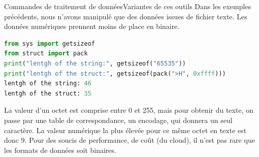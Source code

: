 \documentclass{beamer}
\begin{document}
    \begin{frame}[fragile]{Commandes de traitement de données}{Variantes de ces outils}
        Dans les exemples précédents, nous n'avons manipulé que des données issues de fichier texte.
        Les données numériques prennent moins de place en binaire.
        \begin{lstlisting}[language=python]
from sys import getsizeof
from struct import pack
print("lentgh of the string:", getsizeof("65535"))
print("lentgh of the struct:", getsizeof(pack(">H", 0xffff)))
lentgh of the string: 46
lentgh of the struct: 35
        \end{lstlisting}
        La valeur d'un octet est comprise entre 0 et 255, mais pour obtenir du texte, on passe par une table de correspondance, un encodage, qui donnera un seul caractère.
        La valeur numérique la plus élevée pour ce même octet en texte est donc 9.
        \bigbreak
        Pour des soucis de performance, de coût (du cloud), il n'est pas rare que les formats de données soit binaires.
    \end{frame}
\end{document}
